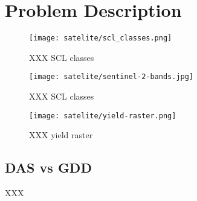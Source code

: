 \chapter{Problem Description}


\begin{figure}[h]
    \caption{XXX SCL classes}
    \label{tab:satelite/scl_classes}
    \center
    \texttt{[image: satelite/scl\_classes.png]}
\end{figure}

\begin{figure}[h]
    \label{fig:satelite/sentinel-2-bands}
    \center
    \texttt{[image: satelite/sentinel-2-bands.jpg]}
    \caption{XXX SCL classes}
\end{figure}

\begin{figure}[h]
    \label{fig:satelite/yield-raster}
    \center
    \texttt{[image: satelite/yield-raster.png]}
    \caption{XXX yield raster}
\end{figure}



\section{DAS vs GDD}
XXX
